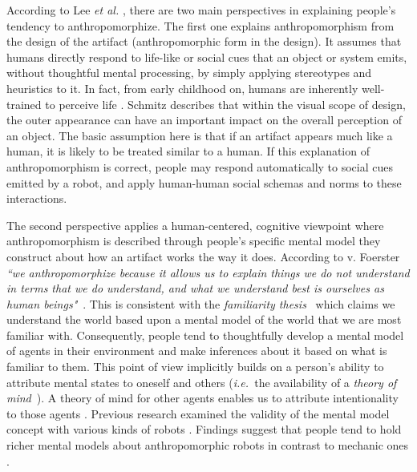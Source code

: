 \documentclass{sig-alternate-2013}
\newcommand{\ie}{{\textit{i.e.~}}}
\begin{document}
According to Lee \textit{et al.} \cite{lee_human_2005},
there are two main perspectives in explaining people's tendency to
anthropomorphize. The first one explains anthropomorphism from the design of
the artifact (anthropomorphic form in the design). It assumes that humans
directly respond to life-like or social cues that an object or system emits,
without thoughtful mental processing, by simply applying stereotypes and
heuristics to it. In fact, from early childhood on, humans are inherently
well-trained to perceive life \cite{epley_seeing_2007}. Schmitz
\cite{schmitz_concepts_2011} describes that within the visual scope of design,
the outer appearance can have an important impact on the overall perception of
an object. The basic assumption here is that if an artifact appears much like a
human, it is likely to be treated similar to a human. If this explanation of
anthropomorphism is correct, people may respond automatically to social cues
emitted by a robot, and apply human-human social schemas and norms to these
interactions.

The second perspective applies a human-centered, cognitive viewpoint where
anthropomorphism is described through people's specific mental model they
construct about how an artifact works the way it does. According to v.
Foerster  \textit{``we anthropomorphize because it allows us to
explain things we do not understand in terms that we do understand, and what
we
 understand best is ourselves as human
beings"}~\cite{hegel_understanding_2008}. This is consistent with the
\emph{familiarity thesis}~\cite{hegel_understanding_2008} which claims we
understand the world
 based upon a mental model of the world that we are most
familiar with.
 Consequently, people tend to thoughtfully develop a mental
model of agents in
 their environment and make inferences about it based on
what is familiar to
 them. This point of view implicitly builds on a person's
ability to attribute
 mental states to oneself and others (\ie the availability
of a \emph{theory of
 mind}~\cite{premack1978does}). A theory of  mind for other
agents enables us to
 attribute intentionality to those agents
\cite{leslie_pretense_1987,admoni_multi-category_2012}. Previous research
examined the validity of the mental model concept with various kinds of robots
\cite{schmitz_concepts_2011,kiesler_mental_2002}. Findings suggest that people
tend to hold richer mental models about anthropomorphic robots in contrast to
mechanic ones \cite{kiesler_mental_2002}.
\end{document}
